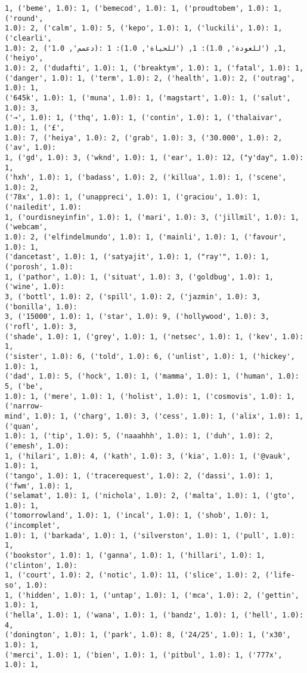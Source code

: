 \documentclass[11pt]{article}
\begin{document}
\begin{Verbatim}[commandchars=\\\{\}]
1, ('beme', 1.0): 1, ('bemecod', 1.0): 1, ('proudtobem', 1.0): 1, ('round',
1.0): 2, ('calm', 1.0): 5, ('kepo', 1.0): 1, ('luckili', 1.0): 1, ('clearli',
1.0): 2, ('دعمم', 1.0): 1, ('للعودة', 1.0): 1, ('للحياة', 1.0): 1, ('heiyo',
1.0): 2, ('dudafti', 1.0): 1, ('breaktym', 1.0): 1, ('fatal', 1.0): 1,
('danger', 1.0): 1, ('term', 1.0): 2, ('health', 1.0): 2, ('outrag', 1.0): 1,
('645k', 1.0): 1, ('muna', 1.0): 1, ('magstart', 1.0): 1, ('salut', 1.0): 3,
('→', 1.0): 1, ('thq', 1.0): 1, ('contin', 1.0): 1, ('thalaivar', 1.0): 1, ('£',
1.0): 7, ('heiya', 1.0): 2, ('grab', 1.0): 3, ('30.000', 1.0): 2, ('av', 1.0):
1, ('gd', 1.0): 3, ('wknd', 1.0): 1, ('ear', 1.0): 12, ("y'day", 1.0): 1,
('hxh', 1.0): 1, ('badass', 1.0): 2, ('killua', 1.0): 1, ('scene', 1.0): 2,
('78x', 1.0): 1, ('unappreci', 1.0): 1, ('graciou', 1.0): 1, ('nailedit', 1.0):
1, ('ourdisneyinfin', 1.0): 1, ('mari', 1.0): 3, ('jillmil', 1.0): 1, ('webcam',
1.0): 2, ('elfindelmundo', 1.0): 1, ('mainli', 1.0): 1, ('favour', 1.0): 1,
('dancetast', 1.0): 1, ('satyajit', 1.0): 1, ("ray'", 1.0): 1, ('porosh', 1.0):
1, ('pathor', 1.0): 1, ('situat', 1.0): 3, ('goldbug', 1.0): 1, ('wine', 1.0):
3, ('bottl', 1.0): 2, ('spill', 1.0): 2, ('jazmin', 1.0): 3, ('bonilla', 1.0):
3, ('15000', 1.0): 1, ('star', 1.0): 9, ('hollywood', 1.0): 3, ('rofl', 1.0): 3,
('shade', 1.0): 1, ('grey', 1.0): 1, ('netsec', 1.0): 1, ('kev', 1.0): 1,
('sister', 1.0): 6, ('told', 1.0): 6, ('unlist', 1.0): 1, ('hickey', 1.0): 1,
('dad', 1.0): 5, ('hock', 1.0): 1, ('mamma', 1.0): 1, ('human', 1.0): 5, ('be',
1.0): 1, ('mere', 1.0): 1, ('holist', 1.0): 1, ('cosmovis', 1.0): 1, ('narrow-
mind', 1.0): 1, ('charg', 1.0): 3, ('cess', 1.0): 1, ('alix', 1.0): 1, ('quan',
1.0): 1, ('tip', 1.0): 5, ('naaahhh', 1.0): 1, ('duh', 1.0): 2, ('emesh', 1.0):
1, ('hilari', 1.0): 4, ('kath', 1.0): 3, ('kia', 1.0): 1, ('@vauk', 1.0): 1,
('tango', 1.0): 1, ('tracerequest', 1.0): 2, ('dassi', 1.0): 1, ('fwm', 1.0): 1,
('selamat', 1.0): 1, ('nichola', 1.0): 2, ('malta', 1.0): 1, ('gto', 1.0): 1,
('tomorrowland', 1.0): 1, ('incal', 1.0): 1, ('shob', 1.0): 1, ('incomplet',
1.0): 1, ('barkada', 1.0): 1, ('silverston', 1.0): 1, ('pull', 1.0): 1,
('bookstor', 1.0): 1, ('ganna', 1.0): 1, ('hillari', 1.0): 1, ('clinton', 1.0):
1, ('court', 1.0): 2, ('notic', 1.0): 11, ('slice', 1.0): 2, ('life-so', 1.0):
1, ('hidden', 1.0): 1, ('untap', 1.0): 1, ('mca', 1.0): 2, ('gettin', 1.0): 1,
('hella', 1.0): 1, ('wana', 1.0): 1, ('bandz', 1.0): 1, ('hell', 1.0): 4,
('donington', 1.0): 1, ('park', 1.0): 8, ('24/25', 1.0): 1, ('x30', 1.0): 1,
('merci', 1.0): 1, ('bien', 1.0): 1, ('pitbul', 1.0): 1, ('777x', 1.0): 1,

\end{Verbatim}
\end{document}
